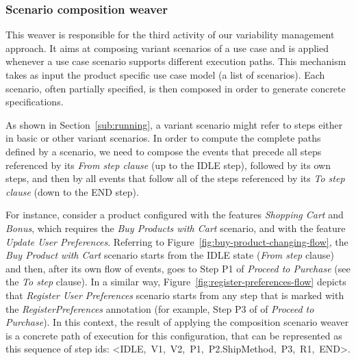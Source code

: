 \documentclass{acm_proc_article-sp}
\begin{document}
% 
% 
% 




\subsubsection{Scenario composition weaver}\label{sub:sc-weaver}

This weaver is responsible for the third activity of our variability management
approach. It aims at composing variant scenarios of a use case and is applied whenever a use case scenario supports different execution paths.
This mechanism takes as input the product specific use case model (a list of scenarios). Each scenario, often partially specified, is then composed in order to generate concrete specifications.

As shown in Section~\ref{sub:running}, a variant scenario
might refer to steps either in basic or other variant scenarios. In order
to compute the complete paths defined by a scenario, we need to compose the events that precede all steps referenced by its \emph{From step
clause} (up to the IDLE step), followed by its own steps, and then by all
events that follow all of the steps referenced by its \emph{To step clause} (down to the END step).

For instance, consider a product configured with the features \emph{Shopping Cart} and \emph{Bonus}, which requires the \emph{Buy Products with Cart} scenario, and with the feature \emph{Update User Preferences}. Referring to Figure~\ref{fig:buy-product-changing-flow}, the  \emph{Buy Product with Cart} scenario starts from the IDLE state (\emph{From step} clause) and then, after its own flow of events, goes to Step P1 of \emph{Proceed to Purchase} (see the \emph{To step} clause). In a similar way, Figure~\ref{fig:register-preferences-flow} depicts that \emph{Register User Preferences} scenario starts from any step that is marked with the \emph{RegisterPreferences} annotation (for example, Step P3 of of \emph{Proceed to Purchase}). In this context, the result of applying the composition scenario weaver is a concrete path of execution for this configuration, that can be represented as this sequence of step ids: \mbox{<IDLE, V1, V2, P1, P2.ShipMethod, P3, R1, END>}.
\end{document}
